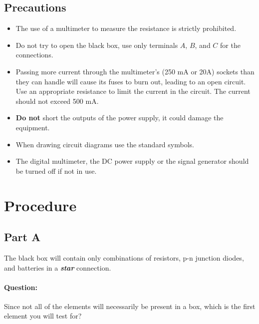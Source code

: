 \begin{refsection}
\begin{description}
\end{description}




\subsection*{Precautions}

\begin{itemize}
\item The use of a multimeter to measure the resistance is strictly prohibited.
\item Do not try to open the black box, use only terminals $A$, $B$, and $C$ for the connections.
\item Passing more current through the multimeter's (250 mA or 20A) sockets than they can handle will cause its fuses to burn out, leading to an open circuit. Use an appropriate resistance to limit the current in the circuit. The current should not exceed 500 mA.
\item \textbf{Do not} short the outputs of the power supply, it could damage the equipment.

\item When drawing circuit diagrams use the standard symbols.
\item The digital multimeter, the DC power supply or the signal generator should be turned off if not in use.

\end{itemize}


\section*{Procedure}

\subsection*{Part A}

The black box will contain only combinations of resistors, p-n junction diodes, and batteries in a \textit{\textbf{star}} connection.

\begin{question}
    \paragraph{Question:} Since not all of the elements will necessarily be present in a box, which is the first element you will test for?
    \end{question}


\end{refsection}
